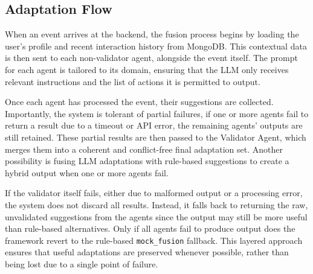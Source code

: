 \documentclass[openany]{book}
\begin{document}
\subsection{Adaptation Flow}
When an event arrives at the backend, the fusion process begins by loading the user’s profile and recent interaction history from MongoDB. This contextual data is then sent to each non-validator agent, alongside the event itself. The prompt for each agent is tailored to its domain, ensuring that the LLM only receives relevant instructions and the list of actions it is permitted to output.

Once each agent has processed the event, their suggestions are collected. Importantly, the system is tolerant of partial failures, if one or more agents fail to return a result due to a timeout or API error, the remaining agents’ outputs are still retained. These partial results are then passed to the Validator Agent, which merges them into a coherent and conflict-free final adaptation set. Another possibility is fusing LLM adaptations with rule-based suggestions to create a hybrid output when one or more agents fail.

If the validator itself fails, either due to malformed output or a processing error, the system does not discard all results. Instead, it falls back to returning the raw, unvalidated suggestions from the agents since the output may still be more useful than rule-based alternatives. Only if all agents fail to produce output does the framework revert to the rule-based \texttt{mock\_fusion} fallback. This layered approach ensures that useful adaptations are preserved whenever possible, rather than being lost due to a single point of failure.
\end{document}
